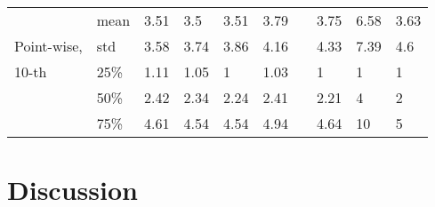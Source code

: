 \begin{table}[p]
\begin{tabular}{@{}llllllllll@{}}
\midrule
& mean & 3.51  & 3.5   & 3.51 & 3.79 &          & 3.75      & 6.58   & 3.63   \\
Point-wise, & std  & 3.58  & 3.74  & 3.86 & 4.16 &          & 4.33      & 7.39   & 4.6    \\
10-th& 25\% & 1.11  & 1.05  & 1    & 1.03 &          & 1         & 1      & 1      \\
& 50\% & 2.42  & 2.34  & 2.24 & 2.41 &          & 2.21      & 4      & 2      \\
& 75\% & 4.61  & 4.54  & 4.54 & 4.94 &          & 4.64      & 10     & 5      \\ \bottomrule
\end{tabular}
\end{table}

\section{Discussion}



